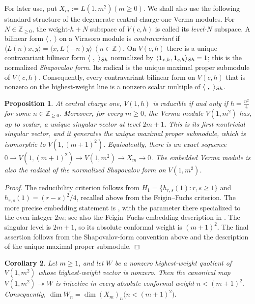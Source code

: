 \documentclass[10pt,a4paper]{amsart}
\numberwithin{equation}{section} \newtheorem{thm}{Theorem}[section] \newtheorem{lem}[thm]{Lemma} \newtheorem{ex}[thm]{Example} \newtheorem{prop}[thm]{Proposition} \newtheorem{cor}[thm]{Corollary} \newtheorem{defi}[thm]{Definition} \newtheorem{rmk}[thm]{Remark} \newtheorem{notation}[thm]{Notation}
\newcommand{\one}{\mathbf{1}}
\def\Z{\mathbb{Z}} \def\N{\mathbb{N}} \def\A{\mathbb{A}} \def\C{\mathbb{C}} \def\R{\mathbb{R}} \def\Q{\mathbb{Q}} \def\F{\mathbb{F}}
\begin{document}
For later use, put \(X_m:=L(1,m^2)(m\ge0).\) We shall also use the following standard structure of the degenerate central-charge-one Verma modules. For $N\in\Z_{\ge0}$, the weight-$h+N$ subspace of $V(c,h)$ is called its \emph{level-$N$} subspace. A bilinear form $\langle\ ,\ \rangle$ on a Virasoro module is \emph{contravariant} if \(\langle L(n)x,y\rangle=\langle x,L(-n)y\rangle\ (n\in\Z).\) On $V(c,h)$ there is a unique contravariant bilinear form $\langle\ ,\ \rangle_{\rm Sh}$ normalized by $\langle\one_{c,h},\one_{c,h}\rangle_{\rm Sh}=1$; this is the normalized \emph{Shapovalov form}. Its radical is the unique maximal proper submodule of $V(c,h)$. Consequently, every contravariant bilinear form on $V(c,h)$ that is nonzero on the highest-weight line is a nonzero scalar multiple of $\langle\ ,\ \rangle_{\rm Sh}$.

\begin{prop}\label{prop:c1-verma}
At central charge one, $V(1,h)$ is reducible if and only if \(h=\frac{n^2}{4}\) for some \(n\in\Z_{\ge0}.\) Moreover, for every $m\ge0$, the Verma module $V(1,m^2)$ has, up to scalar, a unique singular vector at level $2m+1$. This is its first nontrivial singular vector, and it generates the unique maximal proper submodule, which is isomorphic to $V(1,(m+1)^2)$. Equivalently, there is an exact sequence \(0\longrightarrow V(1,(m+1)^2)\longrightarrow V(1,m^2)\longrightarrow X_m\longrightarrow0\). The embedded Verma module is also the radical of the normalized Shapovalov form on $V(1,m^2)$.
\end{prop}

\begin{proof}
The reducibility criterion follows from $H_1=\{h_{r,s}(1):r,s\ge1\}$ and $h_{r,s}(1)=(r-s)^2/4$, recalled above from the Feigin--Fuchs criterion. The more precise embedding statement is \cite[Proposition~2.1]{Milas}, with the parameter there specialized to the even integer $2m$; see also the Feigin--Fuchs embedding description in \cite{KR}. The singular level is $2m+1$, so its absolute conformal weight is \((m+1)^2.\) The final assertion follows from the Shapovalov-form convention above and the description of the unique maximal proper submodule.
\end{proof}

\begin{cor}\label{cor:c1-verma-low-weight}
Let $m\ge1$, and let $W$ be a nonzero highest-weight quotient of $V(1,m^2)$ whose highest-weight vector is nonzero. Then the canonical map \(V(1,m^2)\twoheadrightarrow W\) is injective in every absolute conformal weight $n<(m+1)^2$. Consequently, \(\dim W_n=\dim(X_m)_n\bigl(n<(m+1)^2\bigr).\)
\end{cor}
\end{document}
